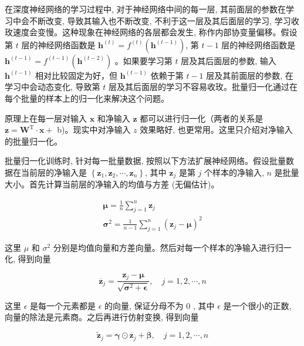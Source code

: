 \documentclass[10pt]{article}
\begin{document}
\begin{CJK*}{UTF8}{bsmi}
在深度神经网络的学习过程中, 对于神经网络中间的每一层, 其前面层的参数在学习中会不断改变, 导致其输入也不断改变, 不利于这一层及其后面层的学习, 学习收玫速度会变慢。这种现象在神经网络的各层都会发生, 称作内部协变量偏移。假设第 $t$ 层的神经网络函数是 $\boldsymbol{h}^{(t)}=f^{(t)}\left(\boldsymbol{h}^{(t-1)}\right)$, 第 $t-1$ 层的神经网络函数是 $\boldsymbol{h}^{(t-1)}=f^{(t-1)}\left(\boldsymbol{h}^{(t-2)}\right)$ 。如果要学习第 $t$ 层及其后面层的参数, 输入 $\boldsymbol{h}^{(t-1)}$ 相对比较固定为好，但 $\boldsymbol{h}^{(t-1)}$ 依赖于第 $t-1$ 层及其前面层的参数, 在学习中会动态变化, 导致第 $t$ 层及其后面层的学习不容易收玫。批量归一化通过在每个批量的样本上的归一化来解决这个问题。

原理上在每一层对输入 $\boldsymbol{x}$ 和净输入 $\boldsymbol{z}$ 都可以进行归一化（两者的关系是 $\boldsymbol{z}=\boldsymbol{W}^{\mathrm{T}} \cdot \boldsymbol{x}+$ b)。现实中对净输入 $z$ 效果略好, 也更常用。这里只介绍对净输入的批量归一化。

批量归一化训练时, 针对每一批量数据, 按照以下方法扩展神经网络。假设批量数据在当前层的净输入是 $\left\{\boldsymbol{z}_{1}, \boldsymbol{z}_{2}, \cdots, \boldsymbol{z}_{n}\right\}$, 其中 $\boldsymbol{z}_{j}$ 是第 $j$ 个样本的净输入, $n$ 是批量大小。首先计算当前层的净输入的均值与方差 (无偏估计)。


\begin{gather*}
\boldsymbol{\mu}=\frac{1}{n} \sum_{j=1}^{n} \boldsymbol{z}_{j}  \tag{23.59}\\
\boldsymbol{\sigma}^{2}=\frac{1}{n-1} \sum_{j=1}^{n}\left(\boldsymbol{z}_{j}-\boldsymbol{\mu}\right)^{2} \tag{23.60}
\end{gather*}


这里 $\mu$ 和 $\sigma^{2}$ 分别是均值向量和方差向量。然后对每一个样本的净输入进行归一化, 得到向量


\begin{equation*}
\overline{\boldsymbol{z}}_{j}=\frac{\boldsymbol{z}_{j}-\boldsymbol{\mu}}{\sqrt{\boldsymbol{\sigma}^{2}+\boldsymbol{\epsilon}}}, \quad j=1,2, \cdots, n \tag{https://cdn.mathpix.com/cropped/2024_03_13_90c63935c3d97d7235e0g-26.jpg?height=173&width=363&top_left_y=5327&top_left_x=5163}
\end{equation*}


这里 $\epsilon$ 是每一个元素都是 $\epsilon$ 的向量, 保证分母不为 0 , 其中 $\epsilon$ 是一个很小的正数, 向量的除法是元素商。之后再进行仿射变换, 得到向量


\begin{equation*}
\tilde{\boldsymbol{z}}_{j}=\boldsymbol{\gamma} \odot \overline{\boldsymbol{z}}_{j}+\boldsymbol{\beta}, \quad j=1,2, \cdots, n \tag{23.62}
\end{equation*}



\end{CJK*}
\end{document}
